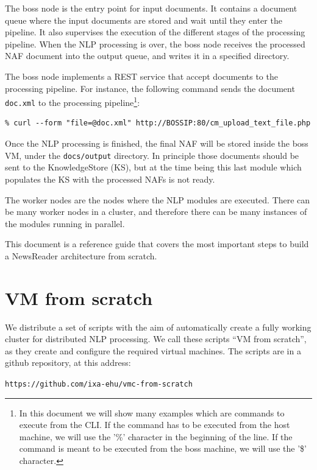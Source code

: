 \documentclass[a4]{article}
\begin{document}
The boss node is the entry point for input documents. It contains a document
queue where the input documents are stored and wait until they enter the
pipeline. It also supervises the execution of the different stages of the
processing pipeline. When the NLP processing is over, the boss node receives
the processed NAF document into the output queue, and writes it in a
specified directory.

The boss node implements a REST service that accept documents to the
processing pipeline. For instance, the following command sends the document
\texttt{doc.xml} to the processing pipeline\footnote{In this document we
  will show many examples which are commands to execute from the CLI. If the
  command has to be executed from the host machine, we will use the '\%'
  character in the beginning of the line. If the command is meant to be
  executed from the boss machine, we will use the '\$' character.}:

\begin{verbatim}
% curl --form "file=@doc.xml" http://BOSSIP:80/cm_upload_text_file.php
\end{verbatim}

Once the NLP processing is finished, the final NAF will be stored inside the
boss VM, under the \texttt{docs/output} directory. In principle those
documents should be sent to the KnowledgeStore (KS), but at the time being
this last module which populates the KS with the processed NAFs is not
ready.

The worker nodes are the nodes where the NLP modules are executed. There can
be many worker nodes in a cluster, and therefore there can be many instances
of the modules running in parallel.

This document is a reference guide that covers the most important steps to
build a NewsReader architecture from scratch.

\section{VM from scratch}
\label{sec:vm-from-scratch}

We distribute a set of scripts with the aim of automatically create a fully
working cluster for distributed NLP processing. We call these scripts ``VM
from scratch'', as they create and configure the required virtual
machines. The scripts are in a github repository, at this address:

\begin{center}
  \texttt{https://github.com/ixa-ehu/vmc-from-scratch}
\end{center}
\end{document}
